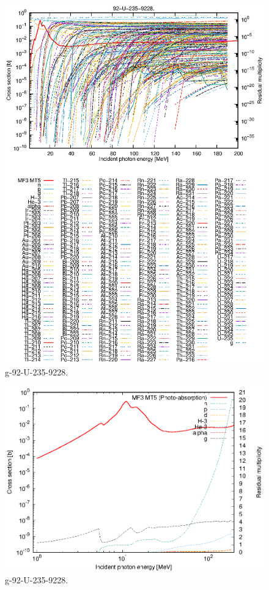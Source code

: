 \begin{figure}
 \includegraphics[width=\linewidth]{eps/g_92-U-235_9228.eps}
  \caption{g-92-U-235-9228.}
\end{figure}
\newpage \clearpage

\begin{figure}
 \includegraphics[width=\linewidth]{eps-log/g_92-U-235_9228.eps}
 \caption{g-92-U-235-9228.}
\end{figure}
\newpage \clearpage

